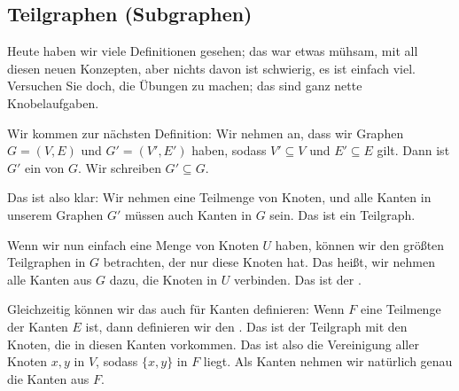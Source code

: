 \subsection{Teilgraphen (Subgraphen)}

\begin{spoken-clean}[00:56:27 - 00:58:25]
Heute haben wir viele Definitionen gesehen; das war etwas mühsam, mit all diesen neuen Konzepten, aber nichts davon ist schwierig, es ist einfach viel. Versuchen Sie doch, die Übungen zu machen; das sind ganz nette Knobelaufgaben.

Wir kommen zur nächsten Definition: Wir nehmen an, dass wir Graphen $G = (V, E)$ und $G' = (V', E')$ haben, sodass $V' \subseteq V$ und $E' \subseteq E$ gilt. Dann ist $G'$ ein  von $G$. Wir schreiben $G' \subseteq G$.

Das ist also klar: Wir nehmen eine Teilmenge von Knoten, und alle Kanten in unserem Graphen $G'$ müssen auch Kanten in $G$ sein. Das ist ein Teilgraph.
\end{spoken-clean}

\begin{math-stroke}[Teilgraphen]
\end{math-stroke}

\begin{spoken-clean}[00:58:25 - 01:01:14]
Wenn wir nun einfach eine Menge von Knoten $U$ haben, können wir den größten Teilgraphen in $G$ betrachten, der nur diese Knoten hat. Das heißt, wir nehmen alle Kanten aus $G$ dazu, die Knoten in $U$ verbinden. Das ist der .

Gleichzeitig können wir das auch für Kanten definieren: Wenn $F$ eine Teilmenge der Kanten $E$ ist, dann definieren wir den . Das ist der Teilgraph mit den Knoten, die in diesen Kanten vorkommen. Das ist also die Vereinigung aller Knoten $x, y$ in $V$, sodass $\{x, y\}$ in $F$ liegt. Als Kanten nehmen wir natürlich genau die Kanten aus $F$.
\end{spoken-clean}

